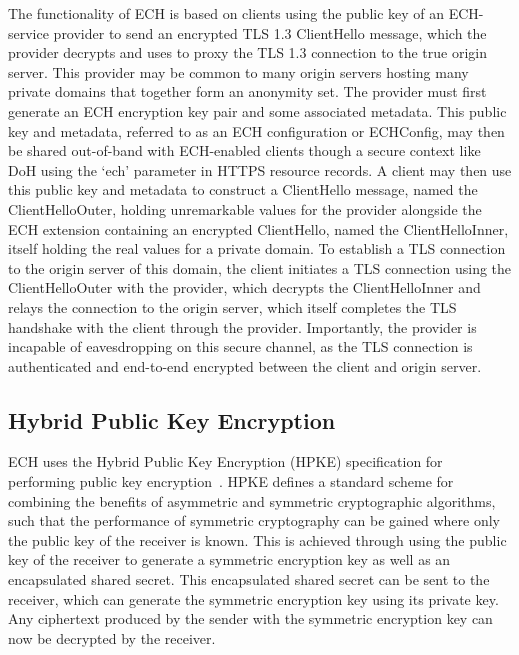 The functionality of ECH is based on clients using the public key of an ECH-service provider to send an encrypted TLS 1.3 ClientHello message, which the provider decrypts and uses to proxy the TLS 1.3 connection to the true origin server. This provider may be common to many origin servers hosting many private domains that together form an anonymity set. The provider must first generate an ECH encryption key pair and some associated metadata. This public key and metadata, referred to as an ECH configuration or ECHConfig, may then be shared out-of-band with ECH-enabled clients though a secure context like DoH using the `ech' parameter in HTTPS resource records. A client may then use this public key and metadata to construct a ClientHello message, named the ClientHelloOuter, holding unremarkable values for the provider alongside the ECH extension containing an encrypted ClientHello, named the ClientHelloInner, itself holding the real values for a private domain. To establish a TLS connection to the origin server of this domain, the client initiates a TLS connection using the ClientHelloOuter with the provider, which decrypts the ClientHelloInner and relays the connection to the origin server, which itself completes the TLS handshake with the client through the provider. Importantly, the provider is incapable of eavesdropping on this secure channel, as the TLS connection is authenticated and end-to-end encrypted between the client and origin server.

\subsection{Hybrid Public Key Encryption}

ECH uses the Hybrid Public Key Encryption (HPKE) specification for performing public key encryption~\cite{rfc9180}. HPKE defines a standard scheme for combining the benefits of asymmetric and symmetric cryptographic algorithms, such that the performance of symmetric cryptography can be gained where only the public key of the receiver is known. This is achieved through using the public key of the receiver to generate a symmetric encryption key as well as an encapsulated shared secret. This encapsulated shared secret can be sent to the receiver, which can generate the symmetric encryption key using its private key. Any ciphertext produced by the sender with the symmetric encryption key can now be decrypted by the receiver.

